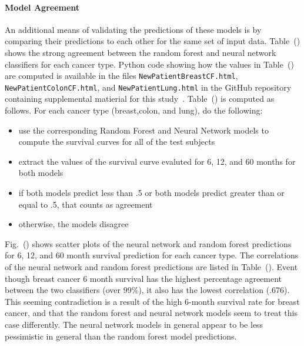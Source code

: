 \documentclass[10pt,letterpaper]{article}
\newcommand{\codewhite}[1]{\colorbox{white}{\texttt{#1}}}
\begin{document}
\paragraph{Model Agreement}
An additional means of validating the predictions of these models is by comparing their predictions to each other for the same set of input data. 
Table~() shows the strong agreement between the random forest and neural network classifiers for each cancer type. Python code showing how the values in Table~() are computed is available in the files 
\codewhite{NewPatientBreastCF.html}, \codewhite{NewPatientColonCF.html}, and \codewhite{NewPatientLung.html} in the GitHub repository containing supplemental matierial for this study~\cite{supp}. Table~() is computed as follows. 
For each cancer type (breast,colon, and lung), do the following:

\begin{itemize}[noitemsep]
\item use the corresponding Random Forest and Neural Network models to compute the survival curves for all of the test subjects
\item extract the values of the survival curve evaluted for 6, 12, and 60 months for both models
\item if both models predict less than .5 or both models predict greater than or equal to .5, that counts as agreement
\item otherwise, the models disagree
\end{itemize}


Fig.~() shows scatter plots of the neural network and random forest predictions for 6, 12, and 60 month survival prediction for each cancer type. The correlations of the neural network and random forest predictions are listed in Table~(). Event though breast cancer 6 month survival has the highest percentage agreement between the two classifiers (over 99$\%$), it also has the lowest correlation (.676). This seeming contradiction is a result of the high 6-month survival rate for breast cancer, and that the random forest and neural network models seem to treat this case differently. The neural network models in general appear to be less pessimistic in general than the random forest model predictions.
\end{document}
